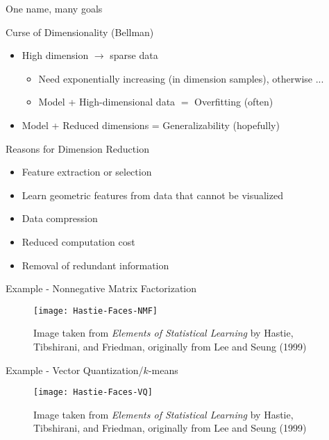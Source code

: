 \documentclass{beamer}
\begin{document}
\begin{frame}{One name, many goals}

\begin{block}{Curse of Dimensionality (Bellman)}
\begin{itemize}
\item High dimension $\rightarrow$ sparse data
	\begin{itemize}
	\item Need exponentially increasing (in dimension samples), otherwise ... \pause 
	\item Model + High-dimensional data  $=$ Overfitting (often) \pause
	\end{itemize}
\item Model + Reduced dimensions  = Generalizability (hopefully) \pause
\end{itemize}

\end{block}

\begin{block}{Reasons for Dimension Reduction}
\begin{itemize}
\item Feature extraction or selection \pause
\item Learn geometric features from data that cannot be visualized \pause
\item Data compression \pause
\item Reduced computation cost  \pause
\item Removal of redundant information
\end{itemize}
\end{block}
\end{frame}


\begin{frame}{Example - Nonnegative Matrix Factorization}
\begin{center}
\begin{figure}[h!]
\texttt{[image: Hastie-Faces-NMF]}
\caption{Image taken from \emph{Elements of Statistical Learning} by Hastie, Tibshirani, and Friedman, originally from Lee and Seung (1999)}
\end{figure}
\end{center}
\end{frame}

\begin{frame}{Example - Vector Quantization/$k$-means}
\begin{center}
\begin{figure}[h!]
\texttt{[image: Hastie-Faces-VQ]}
\caption{Image taken from \emph{Elements of Statistical Learning} by Hastie, Tibshirani, and Friedman, originally from Lee and Seung (1999)}
\end{figure}
\end{center}
\end{frame}
\end{document}

